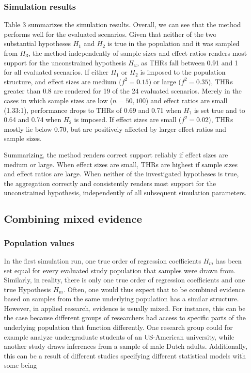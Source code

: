 \documentclass[11pt, a4paper]{article} %
\begin{document}
\subsubsection{Simulation results}
Table 3 summarizes the simulation results. Overall, we can see that the method performs well for the evaluated scenarios. Given that neither of the two substantial hypotheses $H_1$ and $H_2$ is true in the population and it was sampled from $H_3$, the method independently of sample sizes and effect ratios renders most support for the unconstrained hypothesis $H_u$, as THRs fall between 0.91 and 1 for all evaluated scenarios. If either $H_1$ or $H_2$ is imposed to the population structure, and effect sizes are medium ($f^2=0.15$) or large ($f^2=0.35$), THRs greater than 0.8 are rendered for 19 of the 24 evaluated scenarios. Merely in the cases in which sample sizes are low ($n=50, 100$) and effect ratios are small (1.33:1), performance drops to THRs of 0.69 and 0.71 when $H_1$ is set true and to 0.64 and 0.74 when $H_2$ is imposed. If effect sizes are small ($f^2=0.02$), THRs mostly lie below 0.70, but are positively affected by larger effect ratios and sample sizes. 

Summarizing, the method renders correct support reliably if effect sizes are medium or large. When effect sizes are small, THRs are highest if sample sizes and effect ratios are large. When neither of the investigated hypotheses is true, the aggregation correctly and consistently renders most support for the unconstrained hypothesis, independently of all subsequent simulation parameters. 


\subsection{Combining mixed evidence}

\subsubsection{Population values}
\noindent In the first simulation run, one true order of regression coefficients $H_m$ has been set equal for every evaluated study population that samples were drawn from. Similarly, in reality, there is only one true order of regression coefficients and one true Hypothesis $H_m$. Often, one would thus expect that to be combined evidence based on samples from the same underlying population has a similar structure. However, in applied research, evidence is usually mixed. For instance, this can be the case because different groups of researchers had access to specific parts of the underlying population that function differently. One research group could for example analyze undergraduate students of an US-American university, while another study draws inferences from a sample of male Dutch adults. Additionally, this can be a result of different studies specifying different statistical models with some being 
\end{document}
